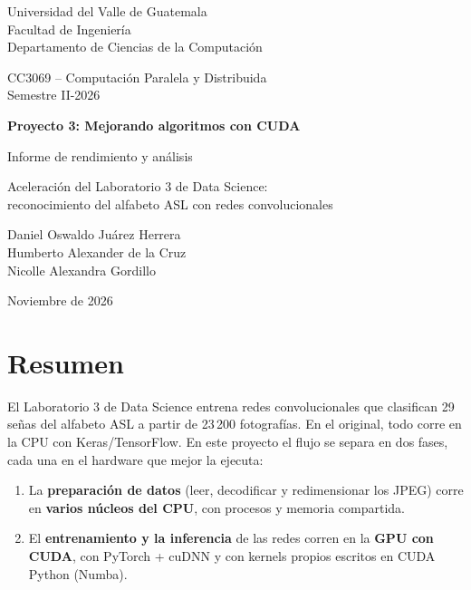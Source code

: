 \documentclass[11pt,letterpaper]{article}
\begin{document}
\begin{titlepage}
\centering
{\large Universidad del Valle de Guatemala\\Facultad de Ingeniería\\Departamento de Ciencias de la Computación\par}
\vspace{0.5cm}
{\large CC3069 -- Computación Paralela y Distribuida\\Semestre II-2026\par}
\vspace{3cm}
{\LARGE\bfseries Proyecto 3: Mejorando algoritmos con CUDA\par}
\vspace{0.6cm}
{\Large Informe de rendimiento y análisis\par}
\vspace{0.4cm}
{\large Aceleración del Laboratorio 3 de Data Science:\\reconocimiento del alfabeto ASL con redes convolucionales\par}
\vfill
{\large
Daniel Oswaldo Juárez Herrera\\
Humberto Alexander de la Cruz\\
Nicolle Alexandra Gordillo\par}
\vspace{1.5cm}
{\large Noviembre de 2026\par}
\end{titlepage}

\section*{Resumen}

El Laboratorio 3 de Data Science entrena redes convolucionales que clasifican 29 señas del alfabeto ASL a partir de 23\,200 fotografías. En el original, todo corre en la CPU con Keras/TensorFlow. En este proyecto el flujo se separa en dos fases, cada una en el hardware que mejor la ejecuta:
\begin{enumerate}
  \item La \textbf{preparación de datos} (leer, decodificar y redimensionar los JPEG) corre en \textbf{varios núcleos del CPU}, con procesos y memoria compartida.
  \item El \textbf{entrenamiento y la inferencia} de las redes corren en la \textbf{GPU con CUDA}, con PyTorch + cuDNN y con kernels propios escritos en CUDA Python (Numba).
\end{enumerate}
\end{document}
